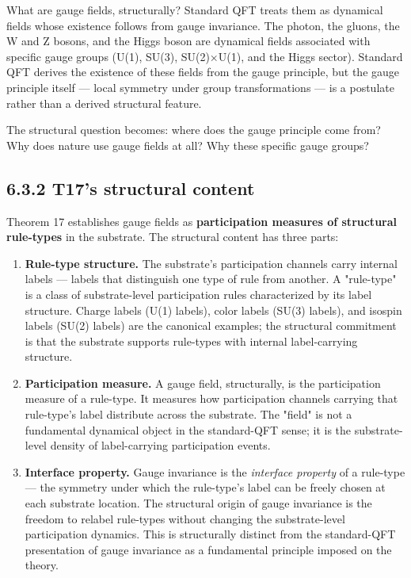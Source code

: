 \documentclass[11pt]{book}
\begin{document}
What are gauge fields, structurally? Standard QFT treats them as dynamical fields whose existence follows from gauge invariance. The photon, the gluons, the W and Z bosons, and the Higgs boson are dynamical fields associated with specific gauge groups (U(1), SU(3), SU(2)×U(1), and the Higgs sector). Standard QFT derives the existence of these fields from the gauge principle, but the gauge principle itself — local symmetry under group transformations — is a postulate rather than a derived structural feature.

The structural question becomes: where does the gauge principle come from? Why does nature use gauge fields at all? Why these specific gauge groups?

\subsection{6.3.2 T17's structural content}

Theorem 17 establishes gauge fields as \textbf{participation measures of structural rule-types} in the substrate. The structural content has three parts:

\begin{enumerate}
\item \textbf{Rule-type structure.} The substrate's participation channels carry internal labels — labels that distinguish one type of rule from another. A "rule-type" is a class of substrate-level participation rules characterized by its label structure. Charge labels (U(1) labels), color labels (SU(3) labels), and isospin labels (SU(2) labels) are the canonical examples; the structural commitment is that the substrate supports rule-types with internal label-carrying structure.
\item \textbf{Participation measure.} A gauge field, structurally, is the participation measure of a rule-type. It measures how participation channels carrying that rule-type's label distribute across the substrate. The "field" is not a fundamental dynamical object in the standard-QFT sense; it is the substrate-level density of label-carrying participation events.
\item \textbf{Interface property.} Gauge invariance is the \textit{interface property} of a rule-type — the symmetry under which the rule-type's label can be freely chosen at each substrate location. The structural origin of gauge invariance is the freedom to relabel rule-types without changing the substrate-level participation dynamics. This is structurally distinct from the standard-QFT presentation of gauge invariance as a fundamental principle imposed on the theory.
\end{enumerate}
\end{document}
